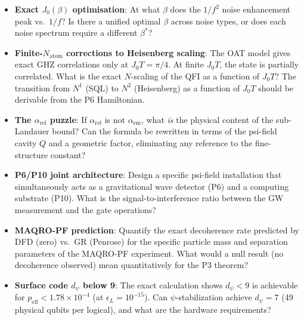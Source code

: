 \documentclass[11pt]{article}
\theoremstyle{definition}
\theoremstyle{remark}
\begin{document}
\begin{itemize}
\item \textbf{Exact $J_0(\beta)$ optimisation}: At what $\beta$ does the
$1/f^2$ noise enhancement peak vs.\ $1/f$? Is there a unified optimal $\beta$
across noise types, or does each noise spectrum require a different $\beta^*$?

\item \textbf{Finite-$N_{\mathrm{atom}}$ corrections to Heisenberg scaling}:
The OAT model gives exact GHZ correlations only at $J_0 T = \pi/4$. At
finite $J_0 T$, the state is partially correlated. What is the exact $N$-scaling
of the QFI as a function of $J_0 T$? The transition from $N^1$ (SQL) to $N^2$
(Heisenberg) as a function of $J_0 T$ should be derivable from the P6 Hamiltonian.

\item \textbf{The $\alpha_{\mathrm{rel}}$ puzzle}: If $\alpha_{\mathrm{rel}}$
is not $\alpha_{\mathrm{em}}$, what \emph{is} the physical content of the
sub-Landauer bound? Can the formula be rewritten in terms of the psi-field
cavity $Q$ and a geometric factor, eliminating any reference to the
fine-structure constant?

\item \textbf{P6/P10 joint architecture}: Design a specific psi-field
installation that simultaneously acts as a gravitational wave detector (P6)
and a computing substrate (P10). What is the signal-to-interference ratio
between the GW measurement and the gate operations?

\item \textbf{MAQRO-PF prediction}: Quantify the exact decoherence rate
predicted by DFD (zero) vs.\ GR (Penrose) for the specific particle mass
and separation parameters of the MAQRO-PF experiment. What would a null
result (no decoherence observed) mean quantitatively for the P3 theorem?

\item \textbf{Surface code $d_\psi$ below 9}: The exact calculation shows
$d_\psi < 9$ is achievable for $p_{\mathrm{eff}} < 1.78\times 10^{-4}$
(at $\epsilon_L = 10^{-15}$). Can $\psi$-stabilization achieve $d_\psi = 7$
(49 physical qubits per logical), and what are the hardware requirements?
\end{itemize}
\end{document}
